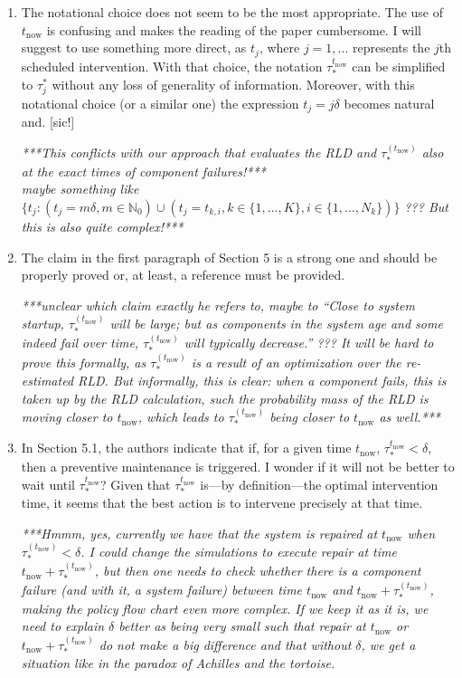 \documentclass[authoryear]{elsarticle}
\newcommand{\naturals}{\mathbb{N}}
\def\tnow{t_\text{now}}
\newcommand{\tausnow}{\tau_*^{(\tnow)}}
\begin{document}
\begin{enumerate}
\item The notational choice does not seem to be the most appropriate. The use of $\tnow$ is confusing and makes the reading of the paper cumbersome. I will suggest to use something more direct, as $t_j$, where $j=1,\ldots$ represents the $j$th scheduled intervention. With that choice, the notation $\tau^{\tnow}_*$ can be simplified to $\tau^*_j$ without any loss of generality of information. Moreover, with this notational choice (or a similar one) the expression $t_j=j \delta$ becomes natural and. [sic!]

\smallskip

\emph{***This conflicts with our approach that evaluates the RLD and $\tausnow$ also at the exact times of component failures!***\\
maybe something like
$\big\{ t_j: (t_j = m\delta, m \in \naturals_0) \cup (t_j = t_{k,i}, k \in \{1,\ldots,K\}, i \in \{1,\ldots, N_k\}) \big\}$ ???
But this is also quite complex!***}

\item The claim in the first paragraph of Section 5 is a strong one and should be properly proved or, at least, a reference must be provided.

\smallskip

\emph{***unclear which claim exactly he refers to, maybe to
``Close to system startup, $\tausnow$ will be large;
but as components in the system age and some indeed fail over time, $\tausnow$ will typically decrease.'' ???
It will be hard to prove this formally, as $\tausnow$ is a result of an optimization over the re-estimated RLD.
But informally, this is clear: when a component fails, this is taken up by the RLD calculation,
such the probability mass of the RLD is moving closer to $\tnow$,
which leads to $\tausnow$ being closer to $\tnow$ as well.***}

\item In Section 5.1, the authors indicate that if, for a given time $\tnow$, $\tau_*^{\tnow}<\delta$, then a preventive maintenance is triggered. I wonder if it will not be better to wait until $\tau_*^{\tnow}$? Given that $\tau_*^{\tnow}$ is---by definition---the optimal intervention time, it seems that the best action is to intervene precisely at that time.

\smallskip

\emph{***Hmmm, yes, currently we have that the system is repaired at $\tnow$ when $\tausnow < \delta$.
I could change the simulations to execute repair at time $\tnow + \tausnow$,
but then one needs to check whether there is a component failure (and with it, a system failure)
between time $\tnow$ and $\tnow + \tausnow$, making the policy flow chart even more complex.
If we keep it as it is, we need to explain $\delta$ better as being very small such that repair at $\tnow$ or $\tnow + \tausnow$
do not make a big difference and that without $\delta$, we get a situation like in the paradox of Achilles and the tortoise.}


\end{enumerate}
\end{document}
